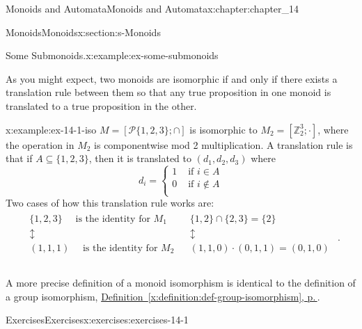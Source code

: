 \documentclass[twoside,10pt,]{book}
\newcommand{\xreffont}{\relax}
\numberwithin{equation}{section}
\begin{document}
\begin{chapterptx}{Monoids and Automata}{}{Monoids and Automata}{}{}{x:chapter:chapter_14}
\begin{sectionptx}{Monoids}{}{Monoids}{}{}{x:section:s-Monoids}
\begin{example}{Some Submonoids.}{x:example:ex-some-submonoids}
\begin{enumerate}[label=(\alph*)]
\end{enumerate}
%
\end{example}
As you might expect, two monoids are isomorphic if and only if there exists a translation rule between them so that any true proposition in one monoid is translated to a true proposition in the other.%
\begin{example}{}{x:example:ex-14-1-iso}%
\(M=[\mathcal{P}\{1,2,3\};\cap  ]\) is isomorphic to \(M_2=\left[\mathbb{Z}_2^3;\cdot \right]\), where the operation in \(M_2\) is componentwise mod 2 multiplication. A translation rule is that if \(A\subseteq \{1,2,3\}\), then it is translated to \(\left(d_1,d_2,d_3\right)\) where%
\begin{equation*}
d_i=\left\{
\begin{array}{cc}
1 & \textrm{ if } i\in A \\
0 & \textrm{ if } i\notin A \\
\end{array}
\right.
\end{equation*}
Two cases of how this translation rule works are:%
\begin{equation*}
\begin{array}{lr}
\begin{array}{c}
\{1, 2, 3\}\quad\textrm{ is the identity for } M_1\\
\updownarrow   \\
(1,1,1) \quad\textrm{ is the identity for }M_2\\
\end{array} 
&     
\begin{array}{c}
\{1, 2\}\cap \{ 2, 3\}=\{2\}\\
\updownarrow \\       
(1, 1, 0) \cdot  (0, 1, 1) = (0, 1, 0)\\
\end{array}\\
\quad
\end{array}\text{.}
\end{equation*}
%
\end{example}
A more precise definition of a monoid isomorphism is identical to the definition of a group isomorphism, \hyperref[x:definition:def-group-isomorphism]{Definition~{\xreffont\ref{x:definition:def-group-isomorphism}}, p.\,\pageref{x:definition:def-group-isomorphism}}.%
%
%
\typeout{************************************************}
\typeout{************************************************}
%
\begin{exercises-subsection}{Exercises}{}{Exercises}{}{}{x:exercises:exercises-14-1}

\end{exercises-subsection}
\end{sectionptx}
\end{chapterptx}
\end{document}
